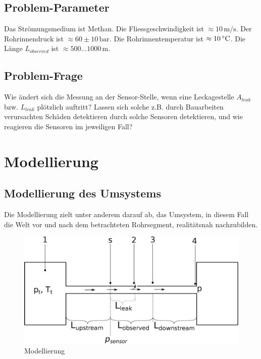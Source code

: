 \documentclass[a4paper,10pt,twocolumn]{article}
\begin{document}
\subsection{Problem-Parameter}

Das Strömungsmedium ist Methan. Die Fliessgeschwindigkeit ist $\approx 10\,\mathrm{m/s}$. Der Rohrinnendruck ist $\approx 60\pm 10\,\mathrm{bar}$. Die Rohrinnentemperatur ist $\approx 10\,\mathrm{\degree C}$. Die Länge $L_\mathit{observed}$ ist $\approx 500 \ldots 1000 \,\mathrm{m}$.

\subsection{Problem-Frage}

Wie ändert sich die Messung an der Sensor-Stelle, wenn eine Leckagestelle $A_\mathit{leak}$ bzw. $L_\mathit{leak}$ plötzlich auftritt? Lassen sich solche z.B. durch Bauarbeiten verursachten Schäden detektieren durch solche Sensoren detektieren, und wie reagieren die Sensoren im jeweiligen Fall?

\section{Modellierung}

\subsection{Modellierung des Umsystems}

Die Modellierung zielt unter anderem darauf ab, das Umsystem, in diesem Fall die Welt vor und nach dem betrachteten Rohrsegment, realitätsnah nachzubilden.

\begin{figure}[hbp]
\centering
\includegraphics[width=0.9\hsize]{model.eps}
\caption{Modellierung}
\label{fig:model}
\end{figure}
\end{document}
